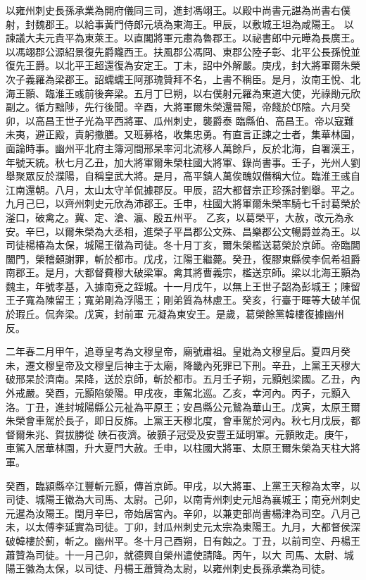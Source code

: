 \begin{pinyinscope}
 以雍州刺史長孫承業為開府儀同三司，進封馮翊王。以殿中尚書元諶為尚書右僕射，封魏郡王。以給事黃門侍郎元填為東海王。甲辰，以敷城王坦為咸陽王。
 以諫議大夫元貴平為東萊王。以直閣將軍元肅為魯郡王。以祕書郎中元曄為長廣王。以馮翊郡公源紹景復先爵隴西王。扶風郡公馮冏、東郡公陸子彰、北平公長孫悅並復先王爵。以北平王超還復為安定王。丁未，詔中外解嚴。庚戌，封大將軍爾朱榮次子義羅為梁郡王。詔蠕蠕王阿那瑰贊拜不名，上書不稱臣。是月，汝南王悅、北海王顥、臨淮王彧前後奔梁。五月丁巳朔，以右僕射元羅為東道大使，光祿勛元欣副之。循方黜陟，先行後聞。辛酉，大將軍爾朱榮還晉陽，帝餞於邙陰。六月癸卯，以高昌王世子光為平西將軍、瓜州刺史，襲爵泰
 臨縣伯、高昌王。帝以寇難未夷，避正殿，責躬撤膳。又班募格，收集忠勇。有直言正諫之士者，集華林園，面論時事。幽州平北府主簿河間邢杲率河北流移人萬餘戶，反於北海，自署漢王，年號天統。秋七月乙丑，加大將軍爾朱榮柱國大將軍、錄尚書事。壬子，光州人劉舉聚眾反於濮陽，自稱皇武大將。是月，高平鎮人萬俟醜奴僭稱大位。臨淮王彧自江南還朝。八月，太山太守羊侃據郡反。甲辰，詔大都督宗正珍孫討劉舉。平之。九月己巳，以齊州刺史元欣為沛郡王。壬申，柱國大將軍爾朱榮率騎七千討葛榮於滏口，破禽之。冀、定、滄、瀛、殷五州平。
 乙亥，以葛榮平，大赦，改元為永安。辛巳，以爾朱榮為大丞相，進榮子平昌郡公文殊、昌樂郡公文暢爵並為王。以司徒楊椿為太保，城陽王徽為司徒。冬十月丁亥，爾朱榮檻送葛榮於京師。帝臨閶闔門，榮稽顙謝罪，斬於都市。戊戌，江陽王繼薨。癸丑，復膠東縣侯李侃希祖爵南郡王。是月，大都督費穆大破梁軍。禽其將曹義宗，檻送京師。梁以北海王顥為魏主，年號孝基，入據南兗之銍城。十一月戊午，以無上王世子韶為彭城王；陳留王子寬為陳留王；寬弟剛為浮陽王；剛弟質為林慮王。癸亥，行臺于暉等大破羊侃於瑕丘。侃奔梁。戊寅，封前軍
 元凝為東安王。是歲，葛榮餘黨韓樓復據幽州反。



 二年春二月甲午，追尊皇考為文穆皇帝，廟號肅祖。皇妣為文穆皇后。夏四月癸未，遷文穆皇帝及文穆皇后神主于太廟，降畿內死罪已下刑。辛丑，上黨王天穆大破邢杲於濟南。杲降，送於京師，斬於都市。五月壬子朔，元顥剋梁國。乙丑，內外戒嚴。癸酉，元顥陷滎陽。甲戌夜，車駕北巡。乙亥，幸河內。丙子，元顥入洛。丁丑，進封城陽縣公元祉為平原王；安昌縣公元鷙為華山王。戊寅，太原王爾朱榮會車駕於長子，即日反旆。上黨王天穆北度，會車駕於河內。秋七月戊辰，都督爾朱兆、賀拔勝從
 硤石夜濟。破顥子冠受及安豐王延明軍。元顥敗走。庚午，車駕入居華林園，升大夏門大赦。壬申，以柱國大將軍、太原王爾朱榮為天柱大將軍。



 癸酉，臨潁縣卒江豐斬元顥，傳首京師。甲戌，以大將軍、上黨王天穆為太宰，以司徒、城陽王徽為大司馬、太尉。己卯，以南青州刺史元旭為襄城王；南兗州刺史元暹為汝陽王。閏月辛巳，帝始居宮內。辛卯，以兼吏部尚書楊津為司空。八月己未，以太傅李延實為司徒。丁卯，封瓜州刺史元太宗為東陽王。九月，大都督侯深破韓樓於薊，斬之。幽州平。冬十月己酉朔，日有蝕之。丁丑，以前司空、丹楊王蕭贊為司徒。十一月己卯，就德興自榮州遣使請降。丙午，以大
 司馬、太尉、城陽王徽為太保，以司徒、丹楊王蕭贊為太尉，以雍州刺史長孫承業為司徒。




\end{pinyinscope}
